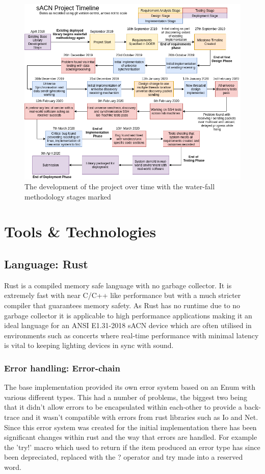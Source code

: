 \documentclass[11pt,a4paper]{article}
\begin{document}
\begin{figure}[H]
\label{project_dev_timeline}
\includegraphics[width=\textwidth]{CS4099-dev-timeline}
\caption{The development of the project over time with the water-fall methodology stages marked}
\end{figure}


\section{Tools \& Technologies}
\subsection{Language: Rust}
Rust \cite{RUST_LANG} is a compiled memory safe language with no garbage collector. It is extremely fast with near C/C++ like performance \cite{RUST_C_COMPARISON} but with a much stricter compiler that guarantees memory safety. As Rust has no runtime due to no garbage collector it is applicable to high performance applications making it an ideal language for an ANSI E1.31-2018 sACN device which are often utilised in environments such as concerts where real-time performance with minimal latency is vital to keeping lighting devices in sync with sound.

\subsubsection{Error handling: Error-chain}
The base implementation provided its own error system based on an Enum with various different types. This had a number of problems, the biggest two being that it didn't allow errors to be encapsulated within each-other to provide a back-trace and it wasn't compatible with errors from rust libraries such as Io and Net. Since this error system was created for the initial implementation there has been significant changes within rust and the way that errors are handled. For example the 'try!' \cite{RUST_TRY} macro which used to return if the item produced an error type has since been depreciated, replaced with the ? operator and try made into a reserved word.\\
\end{document}
